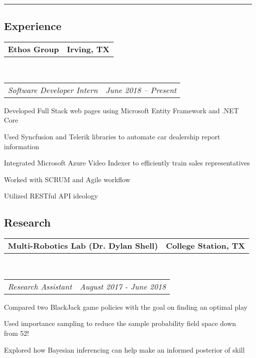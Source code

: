 \documentclass[10pt,letterpaper]{article}
\makeatletter
\newenvironment{indentsection}[1]%
{\begin{list}{}%
	{\setlength{\leftmargin}{#1}}%
	\item[]%
}
{\end{list}}
\newcommand{\headerrow}[2]
{\begin{tabular*}{\linewidth}{l@{\extracolsep{\fill}}r}
	#1 &
	#2 \\
\end{tabular*}}
\makeatother
\begin{document}
\hrule
\vspace{-0.8em}
\subsection*{Experience}
\begin{indentsection}{\parindent}
	\vspace{-0.4em}
	\headerrow
		{\textbf{Ethos Group}}
		{\textbf{Irving, TX}}
	\\
	\headerrow
		{\emph{Software Developer Intern}}
		{\emph{June 2018 -- Present}}
	\begin{itemize*}
		\item Developed Full Stack web pages using Microsoft Entity Framework and .NET Core 
		\item Used Syncfusion and Telerik libraries to automate car dealership report information
		\item Integrated Microsoft Azure Video Indexer to efficiently train sales representatives 
		\item Worked with SCRUM and Agile workflow
		\item Utilized RESTful API ideology
	\end{itemize*}
\end{indentsection}

\vspace{-1.8em}
\subsection*{Research}
\begin{indentsection}{\parindent}
	\vspace{-0.4em}
	\headerrow
		{\textbf{Multi-Robotics Lab (Dr. Dylan Shell)}}
		{\textbf{College Station, TX}}
	\\
	\headerrow
		{\emph{Research Assistant}}
		{\emph{August 2017 - June 2018}}
	\begin{itemize*}
		\item Compared two BlackJack game policies with the goal on finding an optimal play 
		\item Used importance sampling to reduce the sample probability field space down from 				52!
		\item Explored how Bayesian inferencing can help make an informed posterior of skill
	\end{itemize*}
\end{indentsection}

\vspace{-1.8em}
\end{document}

